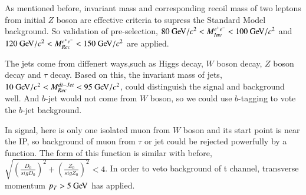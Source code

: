 \documentclass[11pt,a4paper]{cepcnote}
\begin{document}
As mentioned before, invariant mass and corresponding recoil mass of two leptons from initial $Z$ boson are effective criteria 
to supress the Standard Model background.
So validation of pre-selection, $80\gev/c^2 < M_{Inv}^{e^+e^-} < 100\gev/c^2$ and $120\gev/c^2 < M_{Rec}^{e^+e^-} < 150\gev/c^2$ are applied.

The jets come from diffenert ways,such as Higgs decay, $W$ boson decay, $Z$ boson decay and $\tau$ decay.
Based on this, the invariant mass of jets, $10\gev/c^2 < M_{Rec}^{di-Jet} < 95\gev/c^2 $, could distinguish the signal and background well. 
And $b$-jet would not come from $W$ boson, so we could use $b$-tagging to vote the $b$-jet background.

In signal, here is only one isolated muon from $W$ boson and its start point is near the IP, so background 
of muon from $\tau$ or jet could be rejected powerfully by a function. The form of this function is similar with before, 
$\sqrt{(\frac{D_{0}}{sigD_{0}})^2+(\frac{Z_{0}}{sigZ_{0}})^2} < 4$.
In order to veto background of t channel, transverse momentum $p_T > 5\gev$ has applied.
\end{document}
